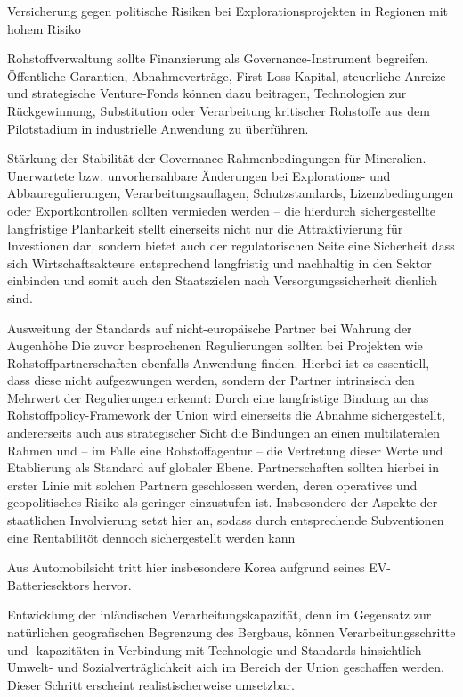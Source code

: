 \documentclass[12pt,a4paper,oneside]{book} %
\begin{document}
Versicherung gegen politische Risiken bei Explorationsprojekten in Regionen mit hohem Risiko

Rohstoffverwaltung sollte Finanzierung als Governance-Instrument begreifen. Öffentliche Garantien, Abnahmeverträge, First-Loss-Kapital, steuerliche Anreize und strategische Venture-Fonds können dazu beitragen, Technologien zur Rückgewinnung, Substitution oder Verarbeitung kritischer Rohstoffe aus dem Pilotstadium in industrielle Anwendung zu überführen.

Stärkung der Stabilität der Governance-Rahmenbedingungen für Mineralien.
Unerwartete bzw. unvorhersahbare Änderungen bei Explorations- und Abbauregulierungen, Verarbeitungsauflagen, Schutzstandards, Lizenzbedingungen oder Exportkontrollen sollten vermieden werden -- die hierdurch sichergestellte langfristige Planbarkeit stellt einerseits nicht nur die Attraktivierung für Investionen dar, sondern bietet auch der regulatorischen Seite eine Sicherheit dass sich Wirtschaftsakteure entsprechend langfristig und nachhaltig in den Sektor einbinden und somit auch den Staatszielen nach Versorgungssicherheit dienlich sind.

Ausweitung der Standards auf nicht-europäische Partner bei Wahrung der Augenhöhe
Die zuvor besprochenen Regulierungen sollten bei Projekten wie Rohstoffpartnerschaften ebenfalls Anwendung finden. Hierbei ist es essentiell, dass diese nicht aufgezwungen werden, sondern der Partner intrinsisch den Mehrwert der Regulierungen erkennt: Durch eine langfristige Bindung an das Rohstoffpolicy-Framework der Union wird einerseits die Abnahme sichergestellt, andererseits auch aus strategischer Sicht die Bindungen an einen multilateralen Rahmen und -- im Falle eine Rohstoffagentur --  die Vertretung dieser Werte und Etablierung als Standard auf globaler Ebene. Partnerschaften sollten hierbei in erster Linie mit solchen Partnern geschlossen werden, deren operatives und geopolitisches Risiko als geringer einzustufen ist. Insbesondere der Aspekte der staatlichen Involvierung setzt hier an, sodass durch entsprechende Subventionen eine Rentabilitöt dennoch sichergestellt werden kann

Aus Automobilsicht tritt hier insbesondere Korea aufgrund seines EV-Batteriesektors hervor.

Entwicklung der inländischen Verarbeitungskapazität, denn im Gegensatz zur natürlichen geografischen Begrenzung des Bergbaus, können Verarbeitungsschritte und -kapazitäten in Verbindung mit Technologie und Standards hinsichtlich Umwelt- und Sozialverträglichkeit aich im Bereich der Union geschaffen werden.
Dieser Schritt erscheint realistischerweise umsetzbar.
\end{document}
